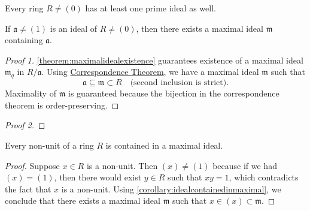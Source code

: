 \begin{corollary}\label{corollary:primeidealexistence}
    Every ring \(R \neq (0)\) has at least one prime ideal as well.
\end{corollary}
\begin{corollary}\label{corollary:idealcontainedinmaximal}
    If \(\mathfrak{a} \neq (1)\) is an ideal of \(R \neq (0)\), then there exists a maximal ideal \(\mathfrak{m}\) containing \(\mathfrak{a}\).
\end{corollary}
\begin{proof}[Proof 1]
\autoref{theorem:maximalidealexistence} guarantees existence of a maximal ideal \(\mathfrak{m}_q\) in \(R/\mathfrak{a}\). Using \hyperref[proposition:correspondencethm]{Correspondence Theorem}, we have a maximal ideal \(\mathfrak{m}\) such that \[\mathfrak{a} \subseteq \mathfrak{m} \subset R \quad (\text{second inclusion is strict)}.\] 
Maximality of \( \mathfrak{m} \) is guaranteed because the bijection in the correspondence theorem is order-preserving.
\end{proof}
\begin{proof}[Proof 2]
\end{proof}
\begin{corollary}\label{corollary:nonunitinmaximalideal}
    Every non-unit of a ring \(R\) is contained in a maximal ideal.
\end{corollary}
\begin{proof}
    Suppose \(x \in R\) is a non-unit. Then \((x) \neq (1)\) because if we had \((x) = (1)\), then there would exist \(y \in R\) such that \(xy = 1\), which contradicts the fact that \(x\) is a non-unit. Using \autoref{corollary:idealcontainedinmaximal}, we conclude that there exists a maximal ideal \(\mathfrak{m}\) such that \(x \in (x) \subset \mathfrak{m}\).
\end{proof}
